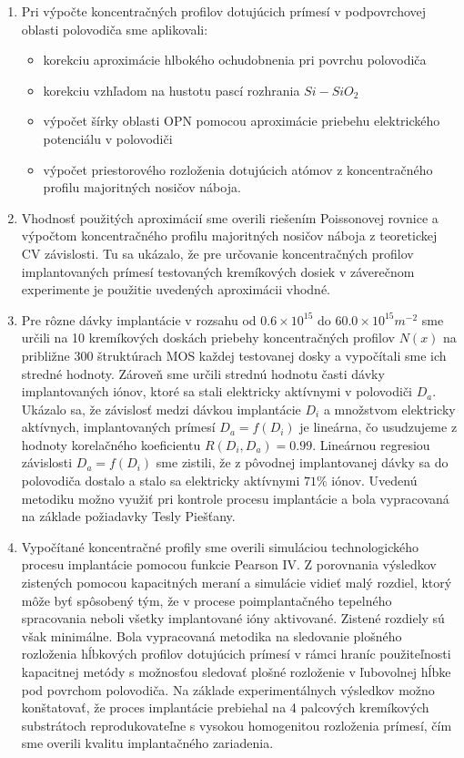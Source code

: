 \begin{enumerate}
\item Pri výpočte koncentračných profilov dotujúcich prímesí v
  podpovrchovej oblasti polovodiča sme aplikovali:

  \begin{itemize}
  \item korekciu aproximácie hlbokého ochudobnenia pri povrchu
    polovodiča
  \item korekciu vzhľadom na hustotu pascí rozhrania $Si-SiO_{2}$
  \item výpočet šírky oblasti OPN pomocou aproximácie priebehu
    elektrického potenciálu v polovodiči
  \item výpočet priestorového rozloženia dotujúcich atómov z
    koncentračného profilu majoritných nosičov náboja.
  \end{itemize}

\item Vhodnosť použitých aproximácií sme overili riešením Poissonovej
  rovnice a výpočtom koncentračného profilu majoritných nosičov náboja
  z teoretickej CV závislosti. Tu sa ukázalo, že pre určovanie
  koncentračných profilov implantovaných prímesí testovaných
  kremíkových dosiek v záverečnom experimente je použitie uvedených
  aproximácii vhodné.

\item Pre rôzne dávky implantácie v rozsahu od $0.6 \times 10^{15}$ do
  $60.0 \times 10^{15} m^{-2}$ sme určili na 10 kremíkových doskách
  priebehy koncentračných profilov $N(x)$ na približne 300 štruktúrach
  MOS každej testovanej dosky a vypočítali sme ich stredné
  hodnoty. Zároveň sme určili strednú hodnotu časti dávky
  implantovaných iónov, ktoré sa stali elektricky aktívnymi v
  polovodiči $D_{a}$. Ukázalo sa, že závislosť medzi dávkou
  implantácie $D_{i}$ a množstvom elektricky aktívnych, implantovaných
  prímesí $D_{a}=f(D_{i})$ je lineárna, čo usudzujeme z hodnoty
  korelačného koeficientu $R(D_{i},D_{a})=0.99$.  Lineárnou regresiou
  závislosti $D_{a}=f(D_{i})$ sme zistili, že z pôvodnej implantovanej
  dávky sa do polovodiča dostalo a stalo sa elektricky aktívnymi
  $71\%$ iónov. Uvedenú metodiku možno využiť pri kontrole procesu
  implantácie a bola vypracovaná na základe požiadavky Tesly Piešťany.

\item Vypočítané koncentračné profily sme overili simuláciou
  technologického procesu implantácie pomocou funkcie Pearson IV\@. Z
  porovnania výsledkov zistených pomocou kapacitných meraní a
  simulácie vidieť malý rozdiel, ktorý môže byť spôsobený tým, že v
  procese poimplantačného tepelného spracovania neboli všetky
  implantované ióny aktivované. Zistené rozdiely sú však
  minimálne. Bola vypracovaná metodika na sledovanie plošného
  rozloženia hĺbkových profilov dotujúcich prímesí v rámci hraníc
  použiteľnosti kapacitnej metódy s možnosťou sledovať plošné
  rozloženie v ľubovolnej hĺbke pod povrchom polovodiča. Na základe
  experimentálnych výsledkov možno konštatovať, že proces implantácie
  prebiehal na 4 palcových kremíkových substrátoch reprodukovateľne s
  vysokou homogenitou rozloženia prímesí, čím sme overili kvalitu
  implantačného zariadenia.


\end{enumerate}
